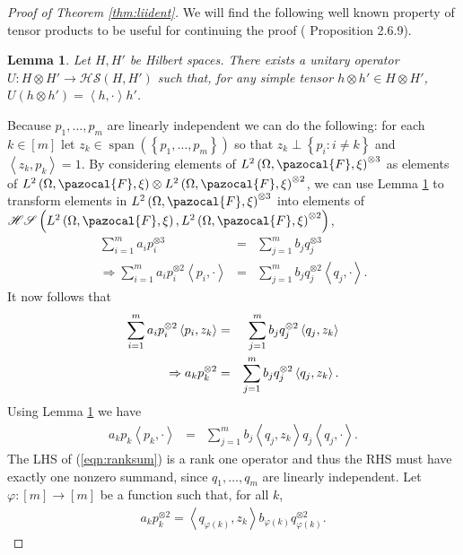 \documentclass[aos,preprint]{imsart}
\def\l{\left}
\def\r{\right}
\def\sF{\pazocal{F}}
\def\hs{\mathscr{HS}}
\def\spn{\operatorname{span}}
\theoremstyle{plain}
\newtheorem{lem}{Lemma}[section]
\theoremstyle{defintion}
\begin{document}
\begin{proof}[Proof of Theorem \ref{thm:liident}]
		We will find the following well known property of tensor products to be useful for continuing the proof (\cite{kadison83} Proposition 2.6.9).
		\begin{lem} \label{lem:hstens}
			Let $H,H'$ be Hilbert spaces. There exists a unitary operator $U:H\otimes H' \to \hs\left( H,H' \right)$ such that, for any simple tensor $h\otimes h' \in H\otimes H'$, $U\left( h\otimes h' \right) = \l<h,\cdot\r> h'$.
		\end{lem}
		Because $p_1,\ldots,p_m$ are linearly independent we can do the following: for each $k \in \left[ m \right]$ let $z_k \in \spn\left(\l\{ p_1,\ldots,p_m \r\}\right)$ so that $z_k \perp \left\{ p_i: i \neq k \right\}$ and $\l<z_k,p_k\r> =1$. By considering elements of $L^2\left( \Omega,\sF, \xi \right)^{\otimes 3}$ as elements of $L^2\left( \Omega,\sF, \xi \right) \otimes L^2\left( \Omega,\sF, \xi \right)^{\otimes 2}$, we can use Lemma \ref{lem:hstens} to transform elements in $L^2\left( \Omega,\sF, \xi \right)^{\otimes 3}$ into elements of $\hs\left( L^2\left( \Omega,\sF, \xi \right),L^2\left( \Omega,\sF, \xi \right)^{\otimes 2} \right)$,
		\begin{eqnarray*}
			\sum_{i=1}^m a_i p_i^{\otimes 3}   &=& \sum_{j=1}^m b_j q_j^{\otimes 3} \\
			\Rightarrow \sum_{i=1}^m a_i p_i^{\otimes 2}\l<p_i,\cdot\r>   &=& \sum_{j=1}^m b_j q_j^{\otimes 2} \l<q_j,\cdot\r>.
		\end{eqnarray*}
		It now follows that
		\begin{eqnarray*}
			\notag \sum_{i=1}^m a_i p_i^{\otimes 2}\l<p_i,z_k\r>   &=& \sum_{j=1}^m b_j q_j^{\otimes 2} \l<q_j,z_k\r>\\
			\Rightarrow a_k p_k^{\otimes 2}  &=& \sum_{j=1}^m b_j q_j^{\otimes 2} \l<q_j,z_k\r>.
		\end{eqnarray*}
		Using Lemma \ref{lem:hstens} we have
		\begin{eqnarray}\label{eqn:ranksum}
			a_k p_k\l<p_k,\cdot\r>  &=& \sum_{j=1}^m b_j\l<q_j,z_k\r> q_j\l<q_j,\cdot\r> .
		\end{eqnarray}
		The LHS of (\ref{eqn:ranksum}) is a rank one operator and thus the RHS must have exactly one nonzero summand, since $q_1,\ldots,q_m$ are linearly independent. Let $\varphi:\left[ m \right]\to \left[ m \right]$ be a function such that, for all $k$,
		\begin{eqnarray*}
			a_k p_k^{\otimes 2} =\l<q_{\varphi\left( k \right)},z_k\r> b_{\varphi\left( k \right)} q_{\varphi\left( k \right)}^{\otimes 2}.
		\end{eqnarray*}

\end{proof}
\end{document}
